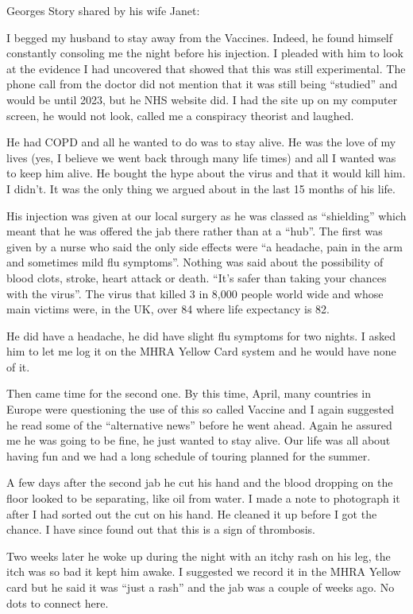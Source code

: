 Georges Story shared by his wife Janet:

I begged my husband to stay away from the Vaccines. Indeed, he found himself
constantly consoling me the night before his injection. I pleaded with him to
look at the evidence I had uncovered that showed that this was still
experimental. The phone call from the doctor did not mention that it was still
being “studied” and would be until 2023, but he NHS website did. I had the site
up on my computer screen, he would not look, called me a conspiracy theorist and
laughed.

He had COPD and all he wanted to do was to stay alive. He was the love of my
lives (yes, I believe we went back through many life times) and all I wanted was
to keep him alive. He bought the hype about the virus and that it would kill
him. I didn’t. It was the only thing we argued about in the last 15 months of
his life.

His injection was given at our local surgery as he was classed as “shielding”
which meant that he was offered the jab there rather than at a “hub”. The first
was given by a nurse who said the only side effects were “a headache, pain in
the arm and sometimes mild flu symptoms”. Nothing was said about the possibility
of blood clots, stroke, heart attack or death. “It’s safer than taking your
chances with the virus”. The virus that killed 3 in 8,000 people world wide and
whose main victims were, in the UK, over 84 where life expectancy is 82.

He did have a headache, he did have slight flu symptoms for two nights. I asked
him to let me log it on the MHRA Yellow Card system and he would have none of
it.

Then came time for the second one. By this time, April, many countries in Europe
were questioning the use of this so called Vaccine and I again suggested he read
some of the “alternative news” before he went ahead. Again he assured me he was
going to be fine, he just wanted to stay alive. Our life was all about having
fun and we had a long schedule of touring planned for the summer.

A few days after the second jab he cut his hand and the blood dropping on the
floor looked to be separating, like oil from water. I made a note to photograph
it after I had sorted out the cut on his hand. He cleaned it up before I got the
chance. I have since found out that this is a sign of thrombosis.

Two weeks later he woke up during the night with an itchy rash on his leg, the
itch was so bad it kept him awake. I suggested we record it in the MHRA Yellow
card but he said it was “just a rash” and the jab was a couple of weeks ago. No
dots to connect here.

